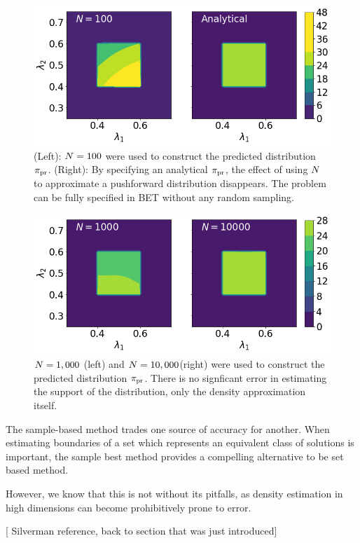 \begin{figure}
\begin{minipage}{.975\textwidth}
\includegraphics[width=\linewidth]{./examples/identity/samp/N100_N100-vs-Analytical_N100.png}
\end{minipage}
\caption{
(Left): $N=100$ were used to construct the predicted distribution $\operatorname*{\pi_{pr}}$.
(Right): By specifying an analytical $\operatorname*{\pi_{pr}}$, the effect of using $N$ to approximate a pushforward distribution disappears. The problem can be fully specified in BET without any random sampling.
}
\label{fig:ex:identity_sampling_1E2}
\end{figure}

\begin{figure}
\begin{minipage}{.975\textwidth}
\includegraphics[width=\linewidth]{./examples/identity/samp/N1000_N1000-vs-N10000_N10000.png}
\end{minipage}
\caption{
$N=1,000$ (left) and $N=10,000$(right) were used to construct the predicted distribution $\operatorname*{\pi_{pr}}$.
There is no signficant error in estimating the support of the distribution, only the density approximation itself.
}
\label{fig:ex:identity_sampling_1E3_1E4}
\end{figure}


The sample-based method trades one source of accuracy for another.
When estimating boundaries of a set which represents an equivalent class of solutions is important, the sample best method provides a compelling alternative to be set based method.

However, we know that this is not without its pitfalls, as density estimation in high dimensions can become prohibitively prone to error.

[ Silverman reference, back to section that was just introduced]
